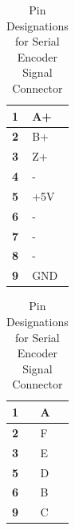 \begin{table}[H]
\centering
\caption{Pin Designations for Serial Encoder Signal Connector}
\label{pintable}
\begin{tabular}{|l|l|}
\hline
\textbf{1} & A+  \\ \hline
\textbf{2} & B+  \\ \hline
\textbf{3} & Z+ \\ \hline
\textbf{4} & - \\ \hline
\textbf{5} & +5V  \\ \hline
\textbf{6} & -  \\ \hline
\textbf{7} & -  \\ \hline
\textbf{8} & -  \\ \hline
\textbf{9} & GND  \\ \hline
\end{tabular}
\end{table}

\newpage

\begin{table}[H]
\centering
\caption{Pin Designations for Serial Encoder Signal Connector}
\label{pintable}
\begin{tabular}{|l|l|}
\hline
\textbf{1} & A  \\ \hline
\textbf{2} & F  \\ \hline
\textbf{3} & E \\ \hline
\textbf{5} & D\\ \hline
\textbf{6} & B \\ \hline
\textbf{9} & C \\ \hline
\end{tabular}
\end{table}
